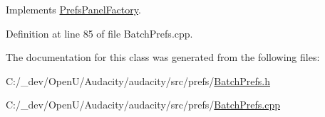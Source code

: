 Implements \hyperlink{class_prefs_panel_factory_a4814184d6050665a43f4929caa73aa0c}{Prefs\+Panel\+Factory}.



Definition at line 85 of file Batch\+Prefs.\+cpp.



The documentation for this class was generated from the following files\+:\begin{DoxyCompactItemize}
\item 
C\+:/\+\_\+dev/\+Open\+U/\+Audacity/audacity/src/prefs/\hyperlink{_batch_prefs_8h}{Batch\+Prefs.\+h}\item 
C\+:/\+\_\+dev/\+Open\+U/\+Audacity/audacity/src/prefs/\hyperlink{_batch_prefs_8cpp}{Batch\+Prefs.\+cpp}\end{DoxyCompactItemize}
